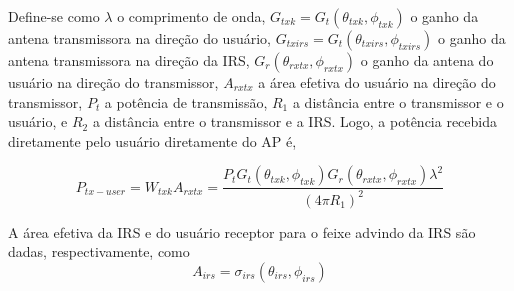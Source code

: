 \documentclass[
	12pt,				%
	openright,			%
	oneside,			%
	a4paper,			%
	english,			%
	brazil				%
	]{abntex2}
\begin{document}
Define-se como $\lambda$ o comprimento de onda,
$G_{txk} = G_{t}(\theta_{txk},\phi_{txk})$ o ganho da antena transmissora na direção do usuário,
$G_{txirs} = G_{t}\left( \theta_{txirs},\phi_{txirs} \right)$ o ganho da antena transmissora na direção da IRS, $G_{r}(\theta_{rxtx},\phi_{rxtx})$ o ganho da antena do usuário na direção do transmissor, $A_{rxtx}$ a área efetiva do usuário na direção do transmissor, $P_{t}$ a potência de transmissão, $R_{1}$ a distância entre o transmissor e o usuário, e $R_{2}$ a distância entre o transmissor e a IRS. Logo, a potência recebida diretamente pelo usuário diretamente do AP é,

\begin{equation}
    P_{tx - user} = W_{txk}A_{rxtx} = \frac{P_{t}G_{t}\left( \theta_{txk},\phi_{txk} \right)G_{r}\left( \theta_{rxtx},\phi_{rxtx} \right)\lambda^{2}}{\left( 4\pi R_{1} \right)^{2}}
\end{equation}


A área efetiva da IRS e do usuário receptor para o feixe advindo da IRS são dadas, respectivamente, como
\begin{equation}
A_{irs} = \sigma_{irs}(\theta_{irs},\phi_{irs})
\end{equation}
\end{document}
